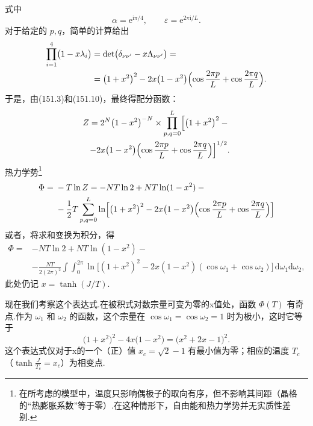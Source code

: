 式中
\begin{equation*}
  \alpha=\mathrm{e}^{\mathrm{i}\pi/4},\qquad
  \varepsilon=\mathrm{e}^{2\pi\mathrm{i}/L}.
\end{equation*}
对于给定的 $p,q$，简单的计算给出
\begin{equation*}
\begin{aligned}
  \prod_{i=1}^{4}\bigl(1-x\lambda_i\bigr)
  &=\det\bigl(\delta_{\nu\nu'}-x\Lambda_{\nu\nu'}\bigr)={}\\
  &=\bigl(1+x^2\bigr)^2-2x\bigl(1-x^2\bigr)
  \Bigl(\cos\frac{2\pi p}{L}+\cos\frac{2\pi q}{L}\Bigr).
\end{aligned}
\end{equation*}
于是，由(151.3)和(151.10)，最终得配分函数：
\begin{equation}
\begin{aligned}
  Z=2^N\bigl(1-x^2\bigr)^{-N}\times\prod_{p,q=0}^{L}
  \Bigl[\bigl(1+x^2\bigr)^2-{}\\
  -2x\bigl(1-x^2\bigr)
  \Bigl(\cos\frac{2\pi p}{L}+\cos\frac{2\pi q}{L}\Bigr)\Bigr]^{1/2}.
\end{aligned}
\end{equation}
热力学势\footnote{在所考虑的模型中，温度只影响偶极子的取向有序，但不影响其间距（晶格的“热膨胀系数”等于零）.在这种情形下，自由能和热力学势并无实质性差别.}
\begin{equation*}
\begin{aligned}
  \Phi={}&-T\ln Z=-NT\ln 2+NT\ln(1-x^2)-{}\\
  &-\frac{1}{2}T\sum_{p,q=0}^{L}\ln\Bigl[\bigl(1+x^2\bigr)^2
  -2x\bigl(1-x^2\bigr)
  \Bigl(\cos\frac{2\pi p}{L}+\cos\frac{2\pi q}{L}\Bigr)\Bigr]
\end{aligned}
\end{equation*}
或者，将求和变换为积分，得
\begin{equation}
\begin{aligned}
  \Phi={}&-NT\ln 2+NT\ln(1-x^2)-{}\\
  &-\frac{NT}{2(2\pi)^2}\int\!\!\!\int_0^{2\pi}
  \ln\bigl[(1+x^2)^2-2x(1-x^2)(\cos\omega_1+\cos\omega_2)\bigr]
  \,\mathrm{d}\omega_1\mathrm{d}\omega_2,
\end{aligned}
\end{equation}
此处仍记 $x=\tanh(J/T)$.

现在我们考察这个表达式.在被积式对数宗量可变为零的x值处，函数 $\Phi(T)$ 有奇点.作为 $\omega_1$ 和 $\omega_2$ 的函数，这个宗量在 $\cos\omega_1=\cos\omega_2=1$ 时为极小，这时它等于
\begin{equation*}
  \bigl(1+x^2\bigr)^2-4x\bigl(1-x^2\bigr)=\bigl(x^2+2x-1\bigr)^2.
\end{equation*}
这个表达式仅对于x的一个（正）值 $x_c=\sqrt{2}-1$ 有最小值为零；相应的温度 $T_c$（$\tanh\frac{J}{T_c}=x_c$）为相变点.

